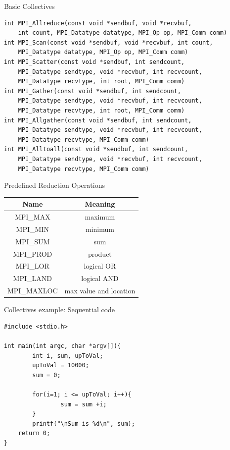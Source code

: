 \begin{frame}[fragile]{Basic Collectives}
  \vspace{-3mm}
\small\begin{verbatim}
int MPI_Allreduce(const void *sendbuf, void *recvbuf,
    int count, MPI_Datatype datatype, MPI_Op op, MPI_Comm comm)
int MPI_Scan(const void *sendbuf, void *recvbuf, int count, 
    MPI_Datatype datatype, MPI_Op op, MPI_Comm comm)
int MPI_Scatter(const void *sendbuf, int sendcount, 
    MPI_Datatype sendtype, void *recvbuf, int recvcount,
    MPI_Datatype recvtype, int root, MPI_Comm comm)
int MPI_Gather(const void *sendbuf, int sendcount, 
    MPI_Datatype sendtype, void *recvbuf, int recvcount,
    MPI_Datatype recvtype, int root, MPI_Comm comm)
int MPI_Allgather(const void *sendbuf, int sendcount, 
    MPI_Datatype sendtype, void *recvbuf, int recvcount,
    MPI_Datatype recvtype, MPI_Comm comm)
int MPI_Alltoall(const void *sendbuf, int sendcount, 
    MPI_Datatype sendtype, void *recvbuf, int recvcount,
    MPI_Datatype recvtype, MPI_Comm comm)

\end{verbatim}
\normalsize
   

\end{frame}

\begin{frame}[fragile]{Predefined Reduction Operations}

\vspace{5mm}
\begin{center}
 \begin{tabular}{||c c||} 
 \hline
 Name & Meaning \\ [0.5ex] 
 \hline\hline
 MPI\_MAX & maximum  \\ 
 \hline
 MPI\_MIN & minimum \\
 \hline
 MPI\_SUM & sum \\
 \hline
 MPI\_PROD & product \\
 \hline
 MPI\_LOR & logical OR \\
 \hline
 MPI\_LAND & logical AND \\
 \hline
 MPI\_MAXLOC & max value and location \\ [1ex] 
 \hline
\end{tabular}
\end{center}



\end{frame}



\begin{frame}[fragile]{Collectives example: Sequential code}
  \vspace{-3mm}
\small\begin{verbatim}
#include <stdio.h>

int main(int argc, char *argv[]){
        int i, sum, upToVal;
        upToVal = 10000;
        sum = 0;

        for(i=1; i <= upToVal; i++){
                sum = sum +i;
        }
        printf("\nSum is %d\n", sum);
    return 0;
}

\end{verbatim}
\normalsize
   

\end{frame}

